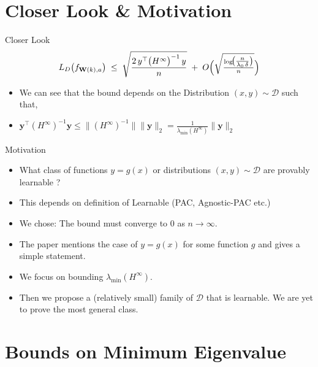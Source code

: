 \documentclass[serif, aspectratio=169]{beamer}
\begin{document}
\section{Closer Look \& Motivation}
\begin{frame}{Closer Look}
	\[
	L_D\bigl(f_{\mathbf{W}(k),a}\bigr)
	\;\le\;
	\sqrt{\frac{2\,y^\top \bigl(H^\infty\bigr)^{-1}\,y}{n}}
	\;+\;
	O\Bigl(\sqrt{\tfrac{\log\!\bigl(\tfrac{n}{\lambda_0\,\delta}\bigr)}{n}}\Bigr)
	\]
	\begin{itemize}
		
		\item We can see that the bound depends on the Distribution \((x,y) \sim \mathcal{D}\) such that,
		
		\item \(\mathbf{y}^\top( H^\infty)^{-1} \mathbf{y} \leq \|(H^\infty)^{-1}\| \|\mathbf{y}\|_2 = \frac{1}{\lambda_{\min}(H^{\infty})} \|\mathbf{y}\|_2 \)
		
		
		
	\end{itemize}
	
\end{frame}



\begin{frame}{Motivation}
	\begin{itemize}
		
		\item What class of functions \(y=g(x)\) or distributions \((x,y) \sim \mathcal{D}\) are provably learnable ?
		\item This depends on definition of Learnable (PAC, Agnostic-PAC etc.)
		\item We chose: The bound must converge to \(0\) as \(n \to \infty\).
		
		\item The paper mentions the case of \(y=g(x)\) for some function \(g\) and gives a simple statement.
		
		\item We focus on bounding \(\lambda_{\min}(H^{\infty})\).
		
		\item Then we propose a (relatively small) family of \(\mathcal{D}\) that is learnable. We are yet to prove the most general class.
		
	\end{itemize}
\end{frame}


\section{Bounds on Minimum Eigenvalue}
\end{document}
